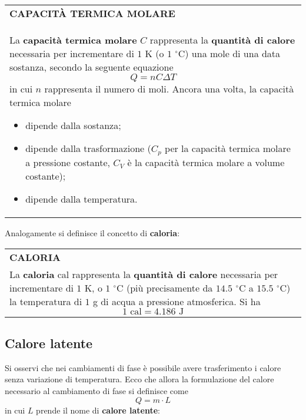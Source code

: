 \documentclass[a4paper]{extarticle}
\renewcommand\arraystretch{}
\begin{document}
\vspace{1em}
\setlength{\tabcolsep}{14pt}
\renewcommand{\arraystretch}{2}
\noindent
\begin{tabularx}{\textwidth}{@{}|P|@{}}
    \hline
    {\textbf{CAPACITÀ TERMICA MOLARE}}\\
    \parbox{\linewidth}{La \textbf{capacità termica molare} $C$ rappresenta la \textbf{quantità di calore} necessaria per incrementare di $1$ K (o $1$ $^\circ$C) una mole di una data sostanza, secondo la seguente equazione
    \[\boxed{Q=n C \Delta T}\]
    in cui $n$ rappresenta il numero di moli. Ancora una volta, la capacità termica molare
    \begin{itemize}
      \item dipende dalla sostanza;
      \item dipende dalla trasformazione ($C_p$ per la capacità termica molare a pressione costante, $C_V$ è la capacità termica molare a volume costante);
      \item dipende dalla temperatura.
    \end{itemize}
    \vspace{1mm}}\\
    \hline
\end{tabularx}

\vspace{2em}
\noindent
Analogamente si definisce il concetto di \textbf{caloria}:

\vspace{1em}
\setlength{\tabcolsep}{14pt}
\renewcommand{\arraystretch}{2}
\noindent
\begin{tabularx}{\textwidth}{@{}|P|@{}}
    \hline
    {\textbf{CALORIA}}\\
    \parbox{\linewidth}{La \textbf{caloria} cal rappresenta la \textbf{quantità di calore} necessaria per incrementare di $1$ K, o $1$ $^\circ$C (più precisamente da $14.5$ $^\circ$C a $15.5$ $^\circ$C) la temperatura di $1$ g di acqua a pressione atmosferica. Si ha
    \[\boxed{1 \text{ cal} = 4.186 \text{ J}}\]
    \vspace{-1mm}}\\
    \hline
\end{tabularx}

\vspace{1em}
\subsection{Calore latente}
Si osservi che nei cambiamenti di fase è possibile avere trasferimento i calore senza variazione di temperatura. Ecco che allora la formulazione del calore necessario al cambiamento di fase si definisce come
\[\boxed{Q=m \cdot L}\]
in cui $L$ prende il nome di \textbf{calore latente}:
\end{document}
